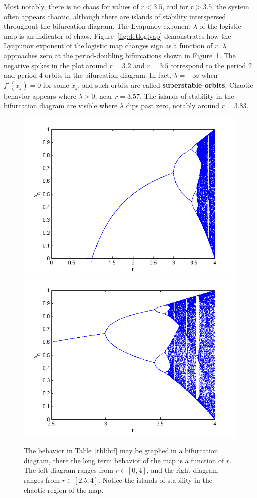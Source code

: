 Most notably, there is no chaos for values of $r
< 3.5$, and for $r > 3.5$, the system often appears chaotic, although
there are islands of stability interspersed throughout the bifurcation
diagram. The Lyapunov exponent $\lambda$ of the logistic map is an indicator of
chaos. Figure~\ref{fig:detloglyap} demonstrates how the Lyapunov
exponent of the logistic map changes sign as a function of
$r$. $\lambda$ approaches zero at the period-doubling bifurcations
shown in Figure~\ref{fig:bif}. The negative spikes in the plot around
$r=3.2$ and $r=3.5$ correspond to the period 2 and period 4 orbits in the
bifurcation diagram. In fact, $\lambda = -\infty$ when $f'(x_j)=0$ for some $x_j$,
and such orbits are called \textbf{superstable orbits}. Chaotic behavior appears where $\lambda >0$, near
$r=3.57$. The islands of stability in the bifurcation diagram are
visible where $\lambda$ dips past zero, notably around $r=3.83$.
\begin{figure}[!h]
\caption[Bifurcation diagram for the deterministic logistic map]{The
  behavior in Table~\ref{tbl:bif} may be graphed in a bifurcation
  diagram, there the long term behavior of the map is a function of $r$. The left diagram ranges from $r\in
  [0,4]$, and the right diagram ranges from $r\in [2.5,4]$. Notice the
  islands of stability in the chaotic region of the map.}\label{fig:bif}
\centering
\includegraphics[width=.5\textwidth]{figs/det_bif_1.png}\hfill
\includegraphics[width=.5\textwidth]{figs/det_bif_2.png}
\end{figure}
